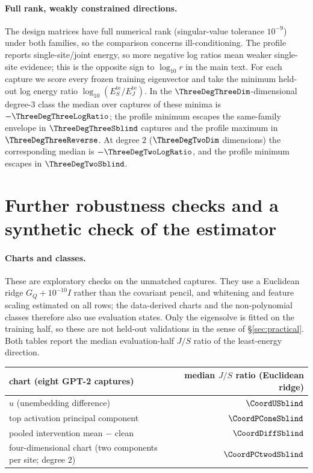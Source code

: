 \paragraph{Full rank, weakly constrained directions.} The design matrices have full numerical rank (singular-value
tolerance $10^{-9}$) under both families, so the comparison concerns ill-conditioning. The profile reports
single-site/joint energy, so more negative log ratios mean weaker single-site evidence; this is the opposite sign to
$\log_{10}r$ in the main text. For each capture we score every
frozen training eigenvector and take the minimum held-out log energy ratio $\log_{10}(E_S^{\mathrm{te}}/E_J^{\mathrm{te}})$. In the
$\ThreeDegThreeDim$-dimensional degree-3 class the median over captures of these minima is $-\ThreeDegThreeLogRatio$;
the profile minimum escapes the same-family envelope in $\ThreeDegThreeSblind$ captures and the profile maximum in
$\ThreeDegThreeReverse$. At degree $2$ ($\ThreeDegTwoDim$ dimensions) the corresponding median is
$-\ThreeDegTwoLogRatio$, and the profile minimum escapes in $\ThreeDegTwoSblind$.

\section{Further robustness checks and a synthetic check of the estimator}
\label{app:robust}

\paragraph{Charts and classes.} These are exploratory checks on the unmatched captures. They use a
Euclidean ridge $G_Q+10^{-10}I$ rather than the covariant pencil, and whitening and feature scaling estimated on all
rows; the data-derived charts and the non-polynomial classes therefore also use evaluation states. Only the
eigensolve is fitted on the training half, so these are not held-out validations in the sense of
\S\ref{sec:practical}. Both tables report the median evaluation-half $J/S$ ratio of the least-energy direction.

\begin{center}\small
\begin{tabular}{lr}
\toprule
chart (eight GPT-2 captures) & median $J/S$ ratio (Euclidean ridge) \\
\midrule
$u$ (unembedding difference) & $\CoordUSblind$ \\
top activation principal component & $\CoordPConeSblind$ \\
pooled intervention mean $-$ clean & $\CoordDiffSblind$ \\
four-dimensional chart (two components per site; degree $2$) & $\CoordPCtwodSblind$ \\
\bottomrule
\end{tabular}
\end{center}


